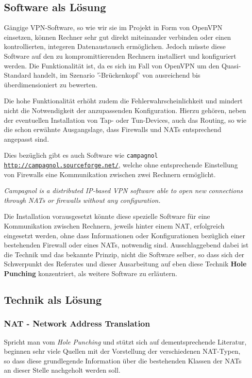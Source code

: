 \subsection{Software als Lösung}
\label{sec:sw-solution} Gängige VPN-Software, so wie wir sie im
Projekt in Form von OpenVPN einsetzen, können Rechner sehr gut direkt
miteinander verbinden oder einen kontrollierten, integeren
Datenaustausch ermöglichen. Jedoch müsste diese Software auf den zu
kompromittierenden Rechnern installiert und konfiguriert werden. Die
Funktionalität ist, da es sich im Fall von OpenVPN um den
Quasi-Standard handelt, im Szenario '\f-Brückenkopf' von
ausreichend bis überdimensioniert zu bewerten.

Die hohe Funktionalität erhöht zudem die Fehlerwahrscheinlichkeit und
mindert nicht die Notwendigkeit der anzupassenden
Konfiguration. Hierzu gehören, neben der eventuellen Installation von
Tap- oder Tun-Devices, auch das Routing, so wie die schon erwähnte
Ausgangslage, dass Firewalls und NATs entsprechend angepasst sind.

Dies bezüglich gibt es auch Software wie \texttt{campagnol
\url{http://campagnol.sourceforge.net/}}, welche ohne entsprechende
Einstellung von Firewalls eine Kommunikation zwischen zwei Rechnern
ermöglicht.

\textit{Campagnol is a distributed IP-based VPN software able to open
new connections through NATs or firewalls without any configuration.}

Die Installation vorausgesetzt könnte diese spezielle Software für
eine Kommunikation zwischen Rechnern, jeweils hinter einem NAT,
erfolgreich eingesetzt werden, ohne dass Informationen oder
Konfigurationen bezüglich einer bestehenden Firewall oder eines NATs,
notwendig sind. Ausschlaggebend dabei ist die Technik und das bekannte
Prinzip, nicht die Software selber, so dass sich der Schwerpunkt des
Referates und dieser Ausarbeitung auf eben diese Technik \textbf{Hole
Punching} konzentriert, als weitere Software zu erläutern.

\subsection{Technik als Lösung}
\subsubsection{NAT - Network Address Translation} Spricht man vom
\textit{Hole Punching} und stützt sich auf dementsprechende Literatur,
beginnen sehr viele Quellen mit der Vorstellung der verschiedenen
NAT-Typen, so dass diese grundlegende Information über die bestehenden
Klassen der NATs an dieser Stelle nachgeholt werden soll.

